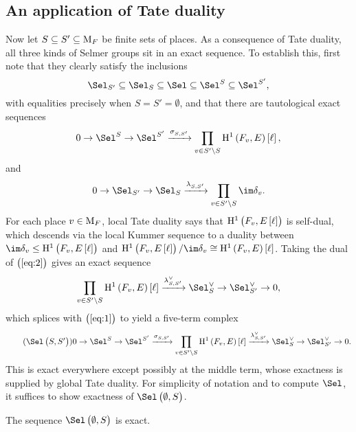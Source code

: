 \subsection{An application of Tate duality}

Now let $ S \subseteq S' \subseteq \mathrm{M}_F $ be finite sets of places. As a consequence of Tate duality, all three kinds of Selmer groups sit in an exact sequence. To establish this, first note that they clearly satisfy the inclusions
$$ \Sel_{S'} \subseteq \Sel_S \subseteq \Sel \subseteq \Sel^S \subseteq \Sel^{S'}, $$
with equalities precisely when $ S = S' = \emptyset $, and that there are tautological exact sequences
\begin{equation}
\label{eq:1}
0 \to \Sel^S \to \Sel^{S'} \xrightarrow{\sigma_{S, S'}} \prod_{v \in S' \setminus S} \H^1\br{F_v, E}\sbr{\ell},
\end{equation}
and
\begin{equation}
\label{eq:2}
0 \to \Sel_{S'} \to \Sel_S \xrightarrow{\lambda_{S, S'}} \prod_{v \in S' \setminus S} \im \delta_v.
\end{equation}
For each place $ v \in \mathrm{M}_F $, local Tate duality says that $ \H^1\br{F_v, E\sbr{\ell}} $ is self-dual, which descends via the local Kummer sequence to a duality between $ \im \delta_v \le \H^1\br{F_v, E\sbr{\ell}} $ and $ \H^1\br{F_v, E\sbr{\ell}} / \im \delta_v \cong \H^1\br{F_v, E}\sbr{\ell} $. Taking the dual of $ \br{\ref{eq:2}} $ gives an exact sequence
$$ \prod_{v \in S' \setminus S} \H^1\br{F_v, E}\sbr{\ell} \xrightarrow{\lambda_{S, S'}^\vee} \Sel_S^\vee \to \Sel_{S'}^\vee \to 0, $$
which splices with $ \br{\ref{eq:1}} $ to yield a five-term complex
\begin{equation}
\tag{$ \Sel\br{S, S'} $}
0 \to \Sel^S \to \Sel^{S'} \xrightarrow{\sigma_{S, S'}} \prod_{v \in S' \setminus S} \H^1\br{F_v, E}\sbr{\ell} \xrightarrow{\lambda_{S, S'}^\vee} \Sel_S^\vee \to \Sel_{S'}^\vee \to 0.
\end{equation}
This is exact everywhere except possibly at the middle term, whose exactness is supplied by global Tate duality. For simplicity of notation and to compute $ \Sel $, it suffices to show exactness of $ \Sel\br{\emptyset, S} $.

\pagebreak

\begin{proposition}
\label{prop:tateduality}
The sequence $ \Sel\br{\emptyset, S} $ is exact.
\end{proposition}

